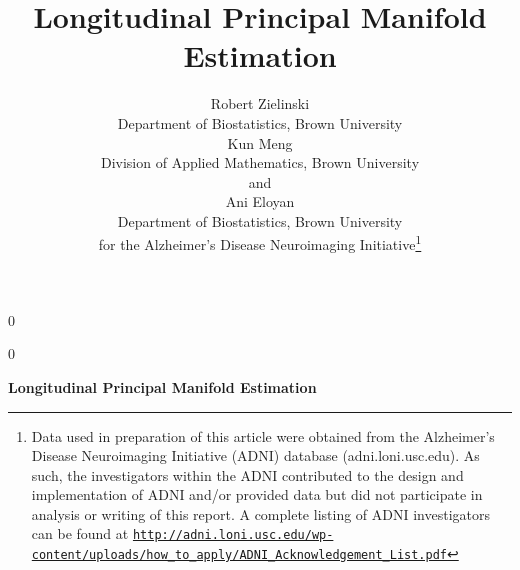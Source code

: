 \documentclass[12pt]{article}
\newcommand{\blind}{0}
\theoremstyle{definition}
\begin{document}
\def\spacingset#1{\renewcommand{\baselinestretch}%
{#1}\small\normalsize} \spacingset{1}



\blind
{
  \title{\bf Longitudinal Principal Manifold Estimation}
  \author{
    Robert Zielinski\hspace{.2cm}\\
    Department of Biostatistics, Brown University\\
    Kun Meng \\
    Division of Applied Mathematics, Brown University\\
    and \\
    Ani Eloyan \\
    Department of Biostatistics, Brown University\\
    for the Alzheimer's Disease Neuroimaging Initiative\thanks{Data used in preparation of this article were obtained from the Alzheimer's Disease Neuroimaging Initiative (ADNI) database (adni.loni.usc.edu). As such, the investigators within the ADNI contributed to the design and implementation of ADNI and/or provided data but did not participate in analysis or writing of this report. A complete listing of ADNI investigators can be found at \href{http://adni.loni.usc.edu/wp-content/uploads/how_to_apply/ADNI_Acknowledgement_List.pdf}{\texttt{http://adni.loni.usc.edu/wp-content/uploads/how\_to\_apply/ADNI\_Acknowledgement\_List.pdf}}}}
  \maketitle
} \fi

\blind
{
  \bigskip
  \bigskip
  \bigskip
  \begin{center}
    {\LARGE\bf Longitudinal Principal Manifold Estimation}
\end{center}
  \medskip
} \fi
\end{document}
